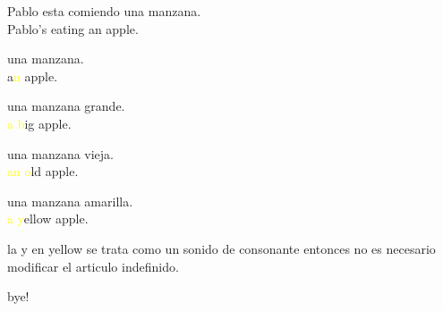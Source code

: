 Pablo esta comiendo una manzana.\\
Pablo's eating an apple.

una manzana.\\
a\textcolor{yellow}{n} apple.

una manzana grande.\\
\textcolor{yellow}{a b}ig apple.

una manzana vieja.\\
\textcolor{yellow}{an o}ld apple.

una manzana amarilla.\\
\textcolor{yellow}{a y}ellow apple.

la y en yellow se trata como un sonido de consonante entonces no es necesario
modificar el articulo indefinido.

bye!








